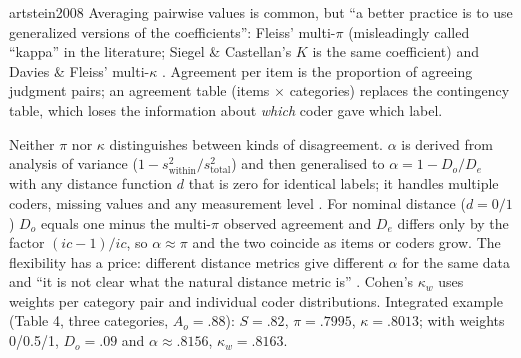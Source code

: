 \begin{papercard}{artstein2008}
 Averaging pairwise values is common, but ``a better practice is to use generalized versions of the coefficients'': Fleiss' multi-$\pi$ (misleadingly called ``kappa'' in the literature; Siegel \& Castellan's $K$ is the same coefficient) and Davies \& Fleiss' multi-$\kappa$ . Agreement per item is the proportion of agreeing judgment pairs; an agreement table (items $\times$ categories) replaces the contingency table, which loses the information about \emph{which} coder gave which label.

 Neither $\pi$ nor $\kappa$ distinguishes between kinds of disagreement. $\alpha$ is derived from analysis of variance ($1-s^2_{\text{within}}/s^2_{\text{total}}$) and then generalised to $\alpha=1-D_o/D_e$ with any distance function $d$ that is zero for identical labels; it handles multiple coders, missing values and any measurement level . For nominal distance ($d=0/1$) $D_o$ equals one minus the multi-$\pi$ observed agreement and $D_e$ differs only by the factor $(ic-1)/ic$, so $\alpha\approx\pi$ and the two coincide as items or coders grow. The flexibility has a price: different distance metrics give different $\alpha$ for the same data and ``it is not clear what the natural distance metric is'' . Cohen's $\kappa_w$ uses weights per category pair and individual coder distributions. Integrated example (Table 4, three categories, $A_o=.88$): $S=.82$, $\pi=.7995$, $\kappa=.8013$; with weights 0/0.5/1, $D_o=.09$ and $\alpha\approx.8156$, $\kappa_w=.8163$.


\end{papercard}
